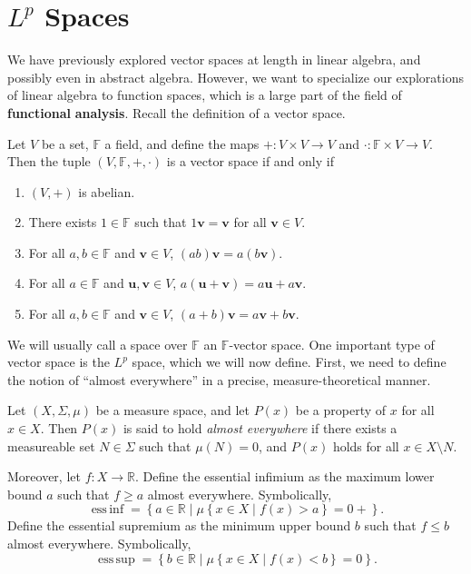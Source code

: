 \documentclass[11pt, letterpaper]{report}
\DeclareMathOperator*{\essinf}{ess\,inf}
\DeclareMathOperator*{\esssup}{ess\,sup}
\begin{document}
\section{$L^p$ Spaces}
We have previously explored vector spaces at length in linear algebra, and possibly even in abstract algebra. However, we want to specialize our explorations of linear algebra to function spaces, which is a large part of the field of \textbf{functional} \textbf{analysis}. Recall the definition of a vector space.
\begin{definition}\label{dfn:2.1}
	Let $V$ be a set, $\mathbb{F}$ a field, and define the maps $+ : V\times V \to V$ and $\cdot : \mathbb{F}\times V \to V$. Then the tuple $(V,\mathbb{F},+,\cdot )$ is a vector space if and only if
	\begin{enumerate}
		\item $(V,+)$ is abelian.
		\item There exists $1\in\mathbb{F}$ such that $1\mathbf{v}=\mathbf{v}$ for all $\mathbf{v}\in V$.
		\item For all $a,b\in\mathbb{F}$ and $\mathbf{v}\in V$, $(ab)\mathbf{v}=a(b \mathbf{v})$.
		\item For all $a\in\mathbb{F}$ and $\mathbf{u},\mathbf{v}\in V$, $a(\mathbf{u}+\mathbf{v})=a \mathbf{u}+a \mathbf{v}$.
		\item For all $a,b\in\mathbb{F}$ and $\mathbf{v}\in V$, $(a+b)\mathbf{v}=a \mathbf{v}+b \mathbf{v}$.
	\end{enumerate}
\end{definition}
We will usually call a space over $\mathbb{F}$ an $\mathbb{F}$-vector space. One important type of vector space is the $L^p$ space, which we will now define. First, we need to define the notion of ``almost everywhere'' in a precise, measure-theoretical manner.
\begin{definition}\label{dfn:2.2}
	Let $(X,\Sigma ,\mu )$ be a measure space, and let $P(x)$ be a property of $x$ for all $x\in X$. Then $P(x)$ is said to hold \emph{almost everywhere} if there exists a measureable set $N\in \Sigma $ such that $\mu (N)=0$, and $P(x)$ holds for all $x\in X\setminus N$.

	Moreover, let $f : X \to \mathbb{R}$. Define the essential infimium as the maximum lower bound $a$ such that $f\geq a$ almost everywhere. Symbolically,
	\[
		\essinf = \left\{ a\in\mathbb{R} \mid \mu \left\{ x\in X \mid f(x)>a \right\} =0+ \right\} 
	.\]
	Define the essential supremium as the minimum upper bound $b$ such that $f\leq b$ almost everywhere. Symbolically,
	\[
		\esssup=\left\{ b\in\mathbb{R} \mid \mu \left\{ x\in X \mid f(x)<b \right\} =0 \right\} 
	.\]
\end{definition}
\end{document}
